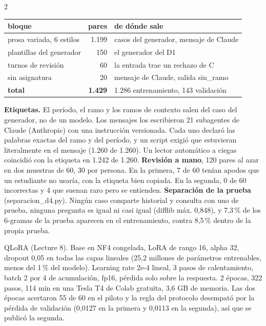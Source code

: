 \documentclass[9pt,a4paper]{extarticle}
\newcommand{\seccion}[1]{\vspace{0.6mm}{\bfseries\footnotesize\color{acento}\MakeUppercase{#1}}\par\nobreak\vspace{0.4mm}\nobreak}
\newcommand{\q}{\textquotedbl}
\newcommand{\cod}[1]{{\ttfamily\small #1}}
\begin{document}
\begin{multicols}{2}
\seccion{Datos de entrenamiento}

{\footnotesize
\begin{tabular}{@{}lrl@{}}
\toprule
bloque & pares & de dónde sale \\
\midrule
prosa variada, 6 estilos & 1.199 & casos del generador, mensaje de Claude \\
plantillas del generador & 150 & el generador del D1 \\
turnos de revisión & 60 & la entrada trae un rechazo de C \\
sin asignatura & 20 & mensaje de Claude, salida \cod{sin\_ramo} \\
\midrule
\textbf{total} & \textbf{1.429} & 1.286 entrenamiento, 143 validación \\
\bottomrule
\end{tabular}\par}

\vspace{0.4mm}
{\footnotesize
\textbf{Etiquetas.} El período, el ramo y los ramos de contexto salen del caso del generador, no
de un modelo. Los mensajes los escribieron 21 subagentes de Claude (Anthropic) con una
instrucción versionada. Cada uno declaró las palabras exactas del ramo y del período, y un script
exigió que estuvieran literalmente en el mensaje (1.260 de 1.260). Un lector automático a ciegas
coincidió con la etiqueta en 1.242 de 1.260. \textbf{Revisión a mano}, 120 pares al azar en dos
muestras de 60, 30 por persona. En la primera, 7 de 60 tenían apodos que un estudiante no usaría,
con la etiqueta bien copiada. En la segunda, 0 de 60 incorrectas y 4 que \q suenan raro pero se
entienden\q. \textbf{Separación de la prueba} (\cod{separacion\_d4.py}). Ningún caso comparte
historial y consulta con uno de prueba, ninguna pregunta es igual ni casi igual (difflib máx.
0,848), y 7,3\,\% de los 6-gramas de la prueba aparecen en el entrenamiento, contra 8,5\,\% dentro
de la propia prueba.\par}

\columnbreak

\seccion{Entrenamiento}

{\footnotesize
QLoRA (Lecture 8). Base en NF4 congelada, LoRA de rango 16, alpha 32, dropout 0,05 en todas las
capas lineales (25,2 millones de parámetros entrenables, menos del 1\,\% del modelo). Learning rate 2e-4
lineal, 3 pasos de calentamiento, batch 2 por 4 de acumulación, fp16, pérdida solo sobre la
respuesta. 2 épocas, 322 pasos, 114 min en una Tesla T4 de Colab gratuita, 3,6 GB de
memoria. Las dos épocas acertaron 55 de 60 en el piloto y la regla del protocolo desempató por
la pérdida de validación (0,0127 en la primera y 0,0113 en la segunda), así que se publicó la segunda.\par}


\end{multicols}
\end{document}
